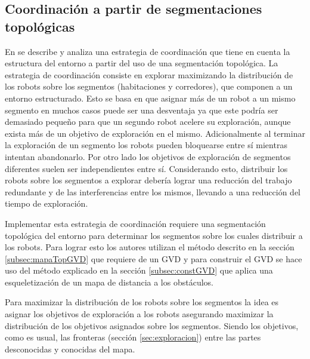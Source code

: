 \subsection{Coordinación a partir de segmentaciones topológicas} \label{subsec:wurmCoord}

En \cite{wurm2008coordinated} se describe y analiza una estrategia de
coordinación que tiene en cuenta la estructura del entorno a partir del uso de
una segmentación topológica. La estrategia de coordinación consiste en explorar
maximizando la distribución de los robots sobre los segmentos (habitaciones y
corredores), que componen a un entorno estructurado. Esto se basa en
que asignar más de un robot a un mismo segmento en muchos casos puede ser una
desventaja ya que este podría ser demasiado pequeño para que un segundo robot
acelere su exploración, aunque exista más de un objetivo de exploración en el
mismo. Adicionalmente al terminar la exploración de un segmento los robots
pueden bloquearse entre sí mientras intentan abandonarlo. Por otro lado los
objetivos de exploración de segmentos diferentes suelen ser independientes
entre sí. Considerando esto, distribuir los robots sobre los segmentos a
explorar debería lograr una reducción del trabajo redundante y de las
interferencias entre los mismos, llevando a una reducción del tiempo de
exploración.

Implementar esta estrategia de coordinación requiere una segmentación topológica
del entorno para determinar los segmentos sobre los cuales distribuir a los
robots. Para lograr esto los autores utilizan el método descrito en la sección
\ref{subsec:mapaTopGVD} que requiere de un GVD y para construir el GVD se hace
uso del método explicado en la sección \ref{subsec:constGVD} que aplica una
esqueletización de un mapa de distancia a los obstáculos.

Para maximizar la distribución de los robots sobre los segmentos la idea es
asignar los objetivos de exploración a los robots asegurando maximizar la
distribución de los objetivos asignados sobre los segmentos. Siendo los
objetivos, como es usual, las fronteras (sección \ref{sec:exploracion}) entre
las partes desconocidas y conocidas del mapa. 

